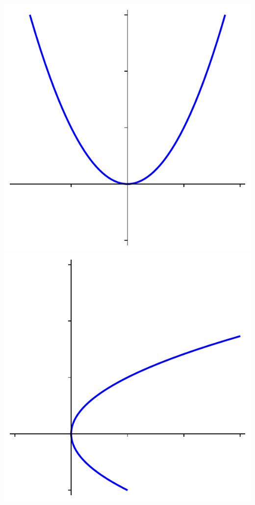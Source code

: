 \begin{center}
\includegraphics[scale=.5]{figures/square.pdf} \hspace{.5in} \includegraphics[scale=.5]{figures/squareroot.pdf}
\end{center}

